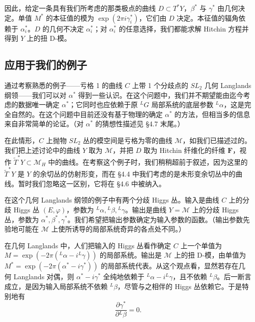 \documentclass[11pt,a4paper]{article}
\begin{document}
因此，给定一条具有我们所考虑的那类极点的曲线 $D\subset T^*Y$，$\beta^*$ 与 $\gamma^*$ 由几何决定。单值 $M^*$ 的本征值的模为 $\exp(2\pi i\gamma_i^*)$，它们由 $D$ 决定。本征值的辐角依赖于 $\alpha_i^*$。$D$ 的几何不决定 $\alpha_i^*$；对 $\alpha_i^*$ 的任意选择，我们都能求解 Hitchin 方程并得到 $Y$ 上的扭 D-模。


\subsection{应用于我们的例子}

通过考察熟悉的例子——亏格 1 的曲线 $C$ 上带 1 个分歧点的 $SL_2$ 几何 Langlands 纲领——我们可以对 $\alpha^*$ 得到一些认识。在这个问题中，我们并不期望能由迄今考虑的数据唯一确定 $\alpha^*$；它同时也应依赖于原 ${}^LG$ 局部系统的底层参数 ${}^L\alpha$，这是完全自然的。在这个问题中目前还没有基于物理的确定 $\alpha^*$ 的方法，但相当多的信息来自非常简单的论证。（对 $\alpha^*$ 的猜想性描述见 §4.7 末尾。）

在此情形，$C$ 上抛物 $SL_2$ 丛的模空间是亏格为零的曲线 $\mathcal{M}$，如我们已描述过的。我们把上述讨论中的曲线 $Y$ 取为 $\mathcal{M}$，并把 $D$ 取为 Hitchin 纤维化的纤维 $\boldsymbol{F}$，视作 $\widetilde{T}^*Y\subset\mathcal{M}_H$ 中的曲线。在考察这个例子时，我们稍稍超前于叙述，因为这里的 $\widetilde{T}^*Y$ 是 $Y$ 的余切丛的仿射形变，而在 §4.4 中我们考虑的是未形变余切丛中的曲线。暂时我们忽略这一区别，它将在 §4.6 中被纳入。

在这个几何 Langlands 纲领的例子中有两个分歧 Higgs 丛。输入是曲线 $C$ 上的分歧 Higgs 丛 $(E,\varphi)$，参数为 ${}^L\alpha,{}^L\beta,{}^L\gamma$。输出是曲线 $Y=\mathcal{M}$ 上的分歧 Higgs 丛，参数为 $\alpha^*,\beta^*,\gamma^*$。我们希望把输出参数确定为输入参数的函数。（输出参数先验地可能在 $\mathcal{M}$ 上使所诱导的局部系统奇异的各点处不同。）

在几何 Langlands 中，人们把输入的 Higgs 丛看作确定 $C$ 上一个单值为 $M=\exp(-2\pi({}^L\alpha-i{}^L\gamma))$ 的局部系统。输出是 $\mathcal{M}$ 上的扭 D-模，由单值为 $M^*=\exp(-2\pi(\alpha^*-i\gamma^*))$ 的局部系统代表。从这个观点看，显然若存在几何 Langlands 对偶，则 $\alpha^*-i\gamma^*$ 全纯地依赖于 ${}^L\alpha-i{}^L\gamma$，且不依赖 ${}^L\beta$。后一断言成立，是因为输入局部系统不依赖 ${}^L\beta$，尽管与之相伴的 Higgs 丛依赖它。于是特别地有
\begin{equation}\tag{4.11}
\frac{\partial\gamma^*}{\partial{}^L\beta}=0.
\end{equation}
\end{document}

